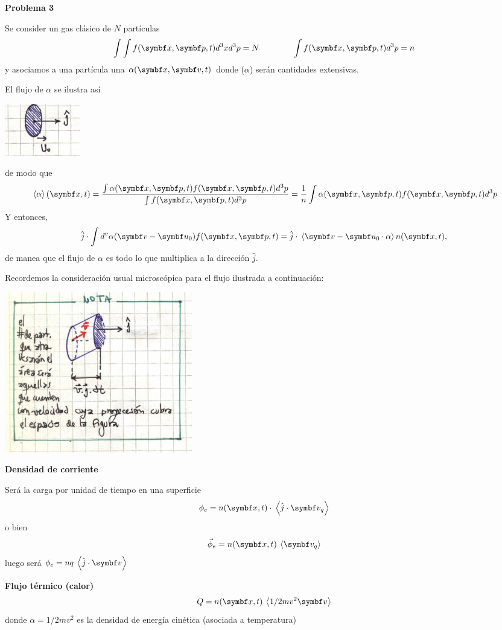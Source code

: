 \documentclass[10pt,oneside]{CBFT_book}
\begin{document}
\begin{ejemplo}{\bf Problema 3}

Se consider un gas clásico de $N$ partículas
\[
	\int \int f(\vb{x}, \vb{p}, t ) d^3x d^3p = N \qquad \qquad 
	\int f(\vb{x}, \vb{p},t) d^3p = n
\]
y asociamos a una partícula una $\alpha(\vb{x}, \vb{v}, t)$ donde ($\alpha$) serán cantidades extensivas.

El flujo de $\alpha$ se ilustra así
 
\includegraphics[scale=0.5]{images/1606329282.jpg}

de modo que
\[
	\vm{\alpha}(\vb{x},t) = \frac{\int \alpha(\vb{x},\vb{p}, t) f(\vb{x},\vb{p},t) d^3p}
	{\int f(\vb{x}, \vb{p},t) d^3p} =
	\frac{1}{n} \int \alpha(\vb{x},\vb{p}, t) f(\vb{x},\vb{p},t) d^3p
\]
Y entonces,
\[
	\hat{j} \cdot \int d^v \alpha(\vb{v}-\vb{u}_0) f(\vb{x},\vb{p},t) =
	\hat{j} \cdot \vm{ \vb{v}-\vb{u}_0 \cdot \alpha } n(\vbx,t),
\]
de manea que el flujo de $\alpha$ es todo lo que multiplica a la dirección $\hat{j}$.

Recordemos la consideración usual microscópica para el flujo ilustrada a continuación:

\includegraphics[scale=0.5]{images/1606329287.jpg}

{\bf Densidad de corriente}

Será la carga por unidad de tiempo en una superficie
\[
	\phi_e = n(\vb{x},t) \cdot \vm{\hat{j}\cdot \vb{v}_q}
\]
o bien 
\[
	\vec{\phi}_e =  n(\vb{x},t) \vm{\vb{v}_q}
\]
luego será $\phi_e = n q \vm{ \hat{j} \cdot \vb{v} }$

{\bf Flujo térmico (calor)}
\[
	Q = n(\vb{x},t) \vm{ 1/2 m v^2 \vb{v} }
\]
donde $ \alpha = 1/2 m v^2 $ es la densidad de energía cinética (asociada a temperatura)


\end{ejemplo}
\end{document}
